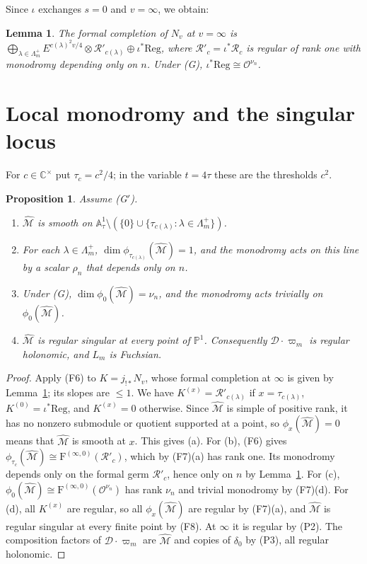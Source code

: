 \documentclass[11pt,a4paper]{article}
\newtheorem{proposition}[theorem]{Proposition}
\newtheorem{lemma}[theorem]{Lemma}
\theoremstyle{definition}
\theoremstyle{remark}
\numberwithin{equation}{section}
\newcommand{\C}{\mathbb{C}}
\newcommand{\A}{\mathbb{A}}
\newcommand{\cD}{\mathcal{D}}
\newcommand{\cM}{\mathcal{M}}
\newcommand{\cO}{\mathcal{O}}
\newcommand{\Four}{\mathrm{F}}
\newcommand{\PP}{\mathbb{P}}
\newcommand{\Mhat}{\widehat{\cM}}
\begin{document}
Since $\iota$ exchanges $s=0$ and $v=\infty$, we obtain:

\begin{lemma}\label{bs:lem:Nv}
The formal completion of $N_v$ at $v=\infty$ is $\bigoplus_{\lambda\in\Lambda_m^+}E^{c(\lambda)^2v/4}\otimes \mathcal R'_{c(\lambda)}\oplus\iota^*\mathrm{Reg}$, where $\mathcal R'_c=\iota^*\mathcal R_c$ is regular of rank one with monodromy depending only on $n$. Under {\rm(G)}, $\iota^*\mathrm{Reg}\cong\cO^{\nu_n}$.
\end{lemma}

\section{Local monodromy and the singular locus}\label{bs:sec:local}

For $c\in\C^\times$ put $\tau_c=c^2/4$; in the variable $t=4\tau$ these are the thresholds $c^2$.

\begin{proposition}\label{bs:prop:phi}
Assume {\rm(G$'$)}.
\begin{enumerate}
\item[(a)] $\Mhat$ is smooth on $\A^1_\tau\setminus(\{0\}\cup\{\tau_{c(\lambda)}:\lambda\in\Lambda_m^+\})$.
\item[(b)] For each $\lambda\in\Lambda_m^+$, $\dim\phi_{\tau_{c(\lambda)}}(\Mhat)=1$, and the monodromy acts on this line by a scalar $\rho_n$ that depends only on $n$.
\item[(c)] Under {\rm(G)}, $\dim\phi_0(\Mhat)=\nu_n$, and the monodromy acts trivially on $\phi_0(\Mhat)$.
\item[(d)] $\Mhat$ is regular singular at every point of $\PP^1$. Consequently $\cD\cdot\varpi_m$ is regular holonomic, and $L_m$ is Fuchsian.
\end{enumerate}
\end{proposition}

\begin{proof}
Apply (F6) to $K=j_{!*}N_v$, whose formal completion at $\infty$ is given by Lemma~\ref{bs:lem:Nv}; its slopes are $\le1$. We have $K^{(x)}=\mathcal R'_{c(\lambda)}$ if $x=\tau_{c(\lambda)}$, $K^{(0)}=\iota^*\mathrm{Reg}$, and $K^{(x)}=0$ otherwise. Since $\Mhat$ is simple of positive rank, it has no nonzero submodule or quotient supported at a point, so $\phi_x(\Mhat)=0$ means that $\Mhat$ is smooth at $x$. This gives (a). For (b), (F6) gives $\phi_{\tau_c}(\Mhat)\cong\Four^{(\infty,0)}(\mathcal R'_c)$, which by (F7)(a) has rank one. Its monodromy depends only on the formal germ $\mathcal R'_c$, hence only on $n$ by Lemma~\ref{bs:lem:Nv}. For (c), $\phi_0(\Mhat)\cong\Four^{(\infty,0)}(\cO^{\nu_n})$ has rank $\nu_n$ and trivial monodromy by (F7)(d). For (d), all $K^{(x)}$ are regular, so all $\phi_x(\Mhat)$ are regular by (F7)(a), and $\Mhat$ is regular singular at every finite point by (F8). At $\infty$ it is regular by (P2). The composition factors of $\cD\cdot\varpi_m$ are $\Mhat$ and copies of $\delta_0$ by (P3), all regular holonomic.
\end{proof}
\end{document}
